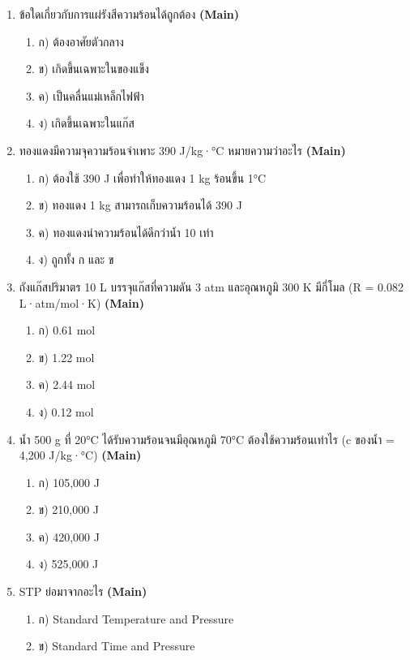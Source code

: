 \documentclass[12pt]{article}
\begin{document}
\begin{enumerate}[label=\arabic*.]
\begin{enumerate}[label=)]
\item ง) ความดันเพิ่มขึ้น 4 เท่า
\end{enumerate}
\item ข้อใดเกี่ยวกับการแผ่รังสีความร้อนได้ถูกต้อง \hfill \textbf{\small (Main)}
\begin{enumerate}[label=)]
\item ก) ต้องอาศัยตัวกลาง
\item ข) เกิดขึ้นเฉพาะในของแข็ง
\item ค) เป็นคลื่นแม่เหล็กไฟฟ้า
\item ง) เกิดขึ้นเฉพาะในแก๊ส
\end{enumerate}
\item ทองแดงมีความจุความร้อนจำเพาะ 390 J/kg·°C หมายความว่าอะไร \hfill \textbf{\small (Main)}
\begin{enumerate}[label=)]
\item ก) ต้องใช้ 390 J เพื่อทำให้ทองแดง 1 kg ร้อนขึ้น 1°C
\item ข) ทองแดง 1 kg สามารถเก็บความร้อนได้ 390 J
\item ค) ทองแดงนำความร้อนได้ดีกว่าน้ำ 10 เท่า
\item ง) ถูกทั้ง ก และ ข
\end{enumerate}
\item ถังแก๊สปริมาตร 10 L บรรจุแก๊สที่ความดัน 3 atm และอุณหภูมิ 300 K มีกี่โมล (R = 0.082 L·atm/mol·K) \hfill \textbf{\small (Main)}
\begin{enumerate}[label=)]
\item ก) 0.61 mol
\item ข) 1.22 mol
\item ค) 2.44 mol
\item ง) 0.12 mol
\end{enumerate}
\item น้ำ 500 g ที่ 20°C ได้รับความร้อนจนมีอุณหภูมิ 70°C ต้องใช้ความร้อนเท่าไร (c ของน้ำ = 4,200 J/kg·°C) \hfill \textbf{\small (Main)}
\begin{enumerate}[label=)]
\item ก) 105,000 J
\item ข) 210,000 J
\item ค) 420,000 J
\item ง) 525,000 J
\end{enumerate}
\item STP ย่อมาจากอะไร \hfill \textbf{\small (Main)}
\begin{enumerate}[label=)]
\item ก) Standard Temperature and Pressure
\item ข) Standard Time and Pressure

\end{enumerate}
\end{enumerate}
\end{document}
